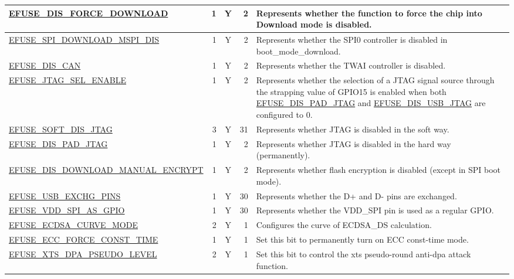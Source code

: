 \begin{longtable}[l]{ |m{8.2cm}|r|c|r|m{9cm}| }
    \hyperref[fielddesc:EFUSEDISFORCEDOWNLOAD]{EFUSE\_DIS\_FORCE\_DOWNLOAD}  & 1 & Y & 2 & Represents whether the function to force the chip into Download mode is disabled. \\ \hline
    \hyperref[fielddesc:EFUSESPIDOWNLOADMSPIDIS]{EFUSE\_SPI\_DOWNLOAD\_MSPI\_DIS}  & 1 & Y & 2 & Represents whether the SPI0 controller is disabled in boot\_mode\_download. \\ \hline
    \hyperref[fielddesc:EFUSEDISCAN]{EFUSE\_DIS\_CAN}  & 1 & Y & 2 & Represents whether the TWAI controller is disabled. \\ \hline
    \hyperref[fielddesc:EFUSEJTAGSELENABLE]{EFUSE\_JTAG\_SEL\_ENABLE}  & 1 & Y & 2 & Represents whether the selection of a JTAG signal source through the strapping value of GPIO15 is enabled when both \hyperref[fielddesc:EFUSEDISPADJTAG]{EFUSE\_DIS\_PAD\_JTAG} and \hyperref[fielddesc:EFUSEDISUSBJTAG]{EFUSE\_DIS\_USB\_JTAG} are configured to 0. \\ \hline
    \hyperref[fielddesc:EFUSESOFTDISJTAG]{EFUSE\_SOFT\_DIS\_JTAG}  & 3 & Y & 31 &  Represents whether JTAG is disabled in the soft way. \\ \hline
    \hyperref[fielddesc:EFUSEDISPADJTAG]{EFUSE\_DIS\_PAD\_JTAG}  & 1 & Y & 2 & Represents whether JTAG is disabled in the hard way (permanently). \\ \hline
    \hyperref[fielddesc:EFUSEDISDOWNLOADMANUALENCRYPT]{EFUSE\_DIS\_DOWNLOAD\_MANUAL\_ENCRYPT}  & 1 & Y & 2 & Represents whether flash encryption is disabled (except in SPI boot mode). \\ \hline
    \hyperref[fielddesc:EFUSEUSBEXCHGPINS]{EFUSE\_USB\_EXCHG\_PINS}  & 1 & Y & 30 & Represents whether the D+ and D- pins are exchanged. \\ \hline
    \hyperref[fielddesc:EFUSEVDDSPIASGPIO]{EFUSE\_VDD\_SPI\_AS\_GPIO}  & 1 & Y & 30 & Represents whether the VDD\_SPI pin is used as a regular GPIO. \\ \hline
    \hyperref[fielddesc:EFUSEECDSACURVEMODE]{EFUSE\_ECDSA\_CURVE\_MODE}  & 2 & Y & 1 & Configures the curve of ECDSA\_DS calculation. \\ \hline
    \hyperref[fielddesc:EFUSEECCFORCECONSTTIME]{EFUSE\_ECC\_FORCE\_CONST\_TIME}  & 1 & Y & 1 & Set this bit to permanently turn on ECC const-time mode. \\ \hline
    \hyperref[fielddesc:EFUSEXTSDPAPSEUDOLEVEL]{EFUSE\_XTS\_DPA\_PSEUDO\_LEVEL}  & 2 & Y & 1 & Set this bit to control the xts pseudo-round anti-dpa attack function. \\ \hline

\end{longtable}
